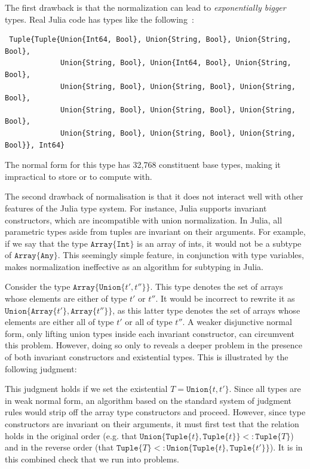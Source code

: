 \documentclass[a4paper,english]{lipics-v2019}
\newcommand{\xt}[1]{\texttt{#1}}
\newcommand{\union}[2]{\xt{Union\{}#1,#2\xt{\}}}
\newcommand{\tuple}[1]{\xt{Tuple\{}#1\xt{\}}}
\newcommand{\arrayt}[1]{\xt{Array\{}#1\xt{\}}}
\begin{document}
The first drawback is that the normalization can lead to \emph{exponentially
bigger} types. Real Julia code has types like the following~\cite{DBLP:NardelliBPCBV18}:

\begin{small}
\begin{verbatim}
 Tuple{Tuple{Union{Int64, Bool}, Union{String, Bool}, Union{String, Bool}, 
             Union{String, Bool}, Union{Int64, Bool}, Union{String, Bool}, 
             Union{String, Bool}, Union{String, Bool}, Union{String, Bool}, 
             Union{String, Bool}, Union{String, Bool}, Union{String, Bool}, 
             Union{String, Bool}, Union{String, Bool}, Union{String, Bool}}, Int64}
\end{verbatim}
\end{small}

\noindent The normal form for this type has 32,768 constituent base types, making it impractical
to store or to compute with.

The second drawback of normalisation is that it does not interact well with
other features of the Julia type system. For instance, Julia supports invariant
constructors, which are incompatible with union normalization. In Julia, all 
parametric types aside from tuples are invariant on their arguments. For example,
if we say that the type $\arrayt{\xt{Int}}$ is an array of ints, it would not
be a subtype of $\arrayt{\xt{Any}}$. This seemingly simple feature, in conjunction
with type variables, makes normalization ineffective as an algorithm for subtyping
in Julia.

Consider the type {\small \(\arrayt{\union{t'}{t''}}\)}. This type denotes the set
of arrays whose elements are either of type {\small $t'$} or {\small   $t''$}.
It would be incorrect to rewrite it as {\small
\(\union{\arrayt{t'}}{\arrayt{t''}}\)}, as this latter type denotes the set of
arrays whose elements are either all of type {\small $t'$} or all of type
{\small$t''$}. A weaker disjunctive normal form, only lifting union types
inside each invariant constructor, can circumvent this problem. However, doing
so only to reveals a deeper problem in the presence of both invariant
constructors and {existential types}. This is illustrated by the following judgment:

%
\vspace{-3mm}{\small\[
  \arrayt{\union{\tuple{t}}{\tuple{t'}}} \ \ <:\ \ \exists T\,.\, \arrayt{\tuple{T}}
\]}\vspace{-3mm}
%

\noindent 
This judgment holds if we set the existential {\small$T=\union{t}{t'}$}.
Since all types are in weak normal form, an algorithm based on the standard
system of judgment rules would strip off the array type constructors and
proceed.  However, since type constructors are invariant on their arguments,
it must first test that the relation holds in the original order (e.g. that
$\union{\tuple{t}}{\tuple{t}} <: \tuple{T}$) and in the reverse order (that
$\tuple{T} <: \union{\tuple{t}}{\tuple{t'}}$). It is in this combined check
that we run into problems.
\end{document}

